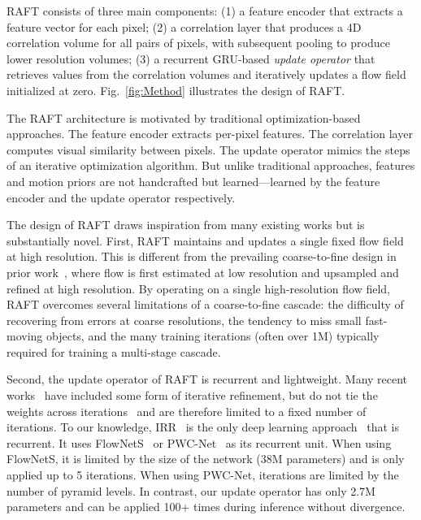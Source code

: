 \documentclass[runningheads]{llncs}
\begin{document}
RAFT consists of three main components: (1) a feature encoder that extracts a feature vector for each pixel; (2) a correlation layer that produces a 4D correlation volume for all pairs of pixels, with subsequent pooling to produce lower resolution volumes; (3) a recurrent GRU-based \emph{update operator} that retrieves values from the correlation volumes and iteratively updates a flow field initialized at zero. Fig.~\ref{fig:Method} illustrates the design of RAFT. 

The RAFT architecture is motivated by traditional optimization-based approaches. The feature encoder extracts per-pixel features. The correlation layer computes visual similarity between pixels. The update operator mimics the steps of an iterative optimization algorithm. But unlike traditional approaches, features and motion priors are not handcrafted but learned---learned by the feature encoder and the update operator respectively. 

The design of RAFT draws inspiration from many existing works but is substantially novel. First, RAFT maintains and updates a single fixed flow field at high resolution. This is different from the prevailing coarse-to-fine design in prior work~\cite{pwcnet,vcn,liteflownet,liteflownet2,hd3}, where flow is first estimated at low resolution and upsampled and refined at high resolution. By operating on a single high-resolution flow field, RAFT overcomes several limitations of a coarse-to-fine cascade: the difficulty of recovering from errors at coarse resolutions, the tendency to miss small fast-moving objects, and the many training iterations (often over 1M) typically required for training a multi-stage cascade. 

Second, the update operator of RAFT is recurrent and lightweight. Many recent works~\cite{irr,pwcnet,vcn,liteflownet,ilg2017flownet} have included some form of iterative refinement, but do not tie the weights across iterations~\cite{pwcnet,vcn,liteflownet} and are therefore limited to a fixed number of iterations. To our knowledge, IRR~\cite{irr} is the only  deep learning approach~\cite{irr} that is recurrent. It uses FlowNetS~\cite{flownet} or PWC-Net~\cite{pwcnet} as its recurrent unit. When using FlowNetS, it is limited by the size of the network (38M parameters) and is only applied up to 5 iterations. When using PWC-Net, iterations are limited by the number of pyramid levels. In contrast, our update operator has only 2.7M parameters and can be applied 100+ times during inference without divergence. 
\end{document}
